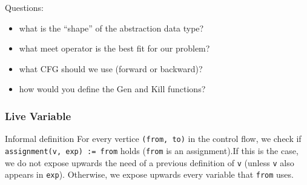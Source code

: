 
\begin{frame}
  Questions:

  \begin{itemize}
   \item what is the ``shape'' of the {\color{blue}abstraction} data type? \pause
   \item what {\color{blue}meet} operator is the best fit for our problem? \pause 
   \item what {\color{blue}CFG} should we use (forward or backward)? \pause
   \item how would you define the {\color{blue}Gen} and {\color{blue}Kill} functions?   
  \end{itemize}
  
\end{frame}


\begin{frame}
  \frametitle{Live Variable}

  \begin{block}{Informal definition}
   For every vertice \texttt{(from, to)} in the control flow,
   we check if \texttt{assignment(v, exp) := from} holds (\texttt{from} is
   an assignment).\pause If this is the case, we do not expose
   upwards the need of a previous definition of \texttt{v} (unless \texttt{v}
   also appears in \texttt{exp}). Otherwise, we expose upwards every
   variable that \texttt{from} uses. 
  \end{block} 
\end{frame}


